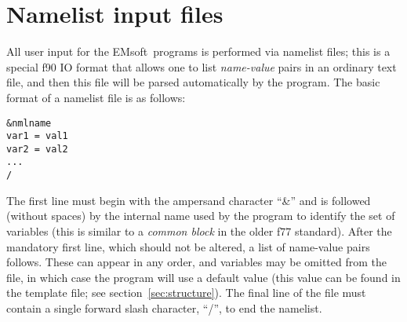 \documentclass[DIV=calc, paper=letter, fontsize=11pt]{scrartcl}	 %
\newcommand{\ctp}{\textsf{EMsoft}}
\begin{document}


\newpage
\section{Namelist input files\label{sec:f90input}}
All user input for the \ctp\ programs is performed via namelist files; this is a special f90 IO format that allows one to list 
\textit{name-value} pairs in an ordinary text file, and then this file will be parsed automatically by the 
program.  The basic format of a namelist file is as follows:
\begin{verbatim}
&nmlname
var1 = val1
var2 = val2
...
/
\end{verbatim}
The first line must begin with the ampersand character ``\&'' and is followed (without spaces) by the internal name used by the program 
to identify the set of variables (this is similar to a \textit{common block} in the older f77 standard).  After the mandatory first line, which should not be altered, a 
list of name-value pairs follows.  These can appear in any order, and variables may be omitted from the file, in which case the program
will use a default value (this value can be found in the template file; see section~\ref{sec:structure}).  The final line of the file must contain a single forward slash
character, ``/'', to end the namelist.
\end{document}

